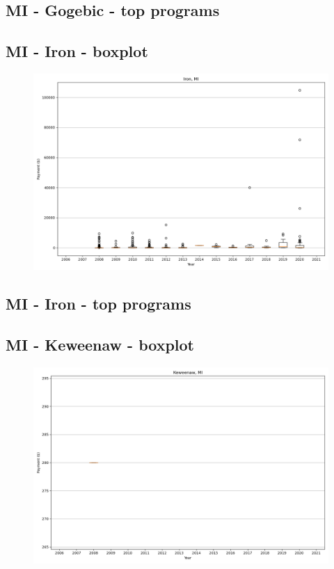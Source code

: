 \subsection*{MI - Gogebic - top programs}

\newpage
\subsection*{MI - Iron - boxplot}
\begin{figure}[h]
\centering
\includegraphics[width=7in]{../output/boxplots/counties/Iron-MI_boxplot.png}
\end{figure}


\subsection*{MI - Iron - top programs}

\newpage
\subsection*{MI - Keweenaw - boxplot}
\begin{figure}[h]
\centering
\includegraphics[width=7in]{../output/boxplots/counties/Keweenaw-MI_boxplot.png}
\end{figure}


